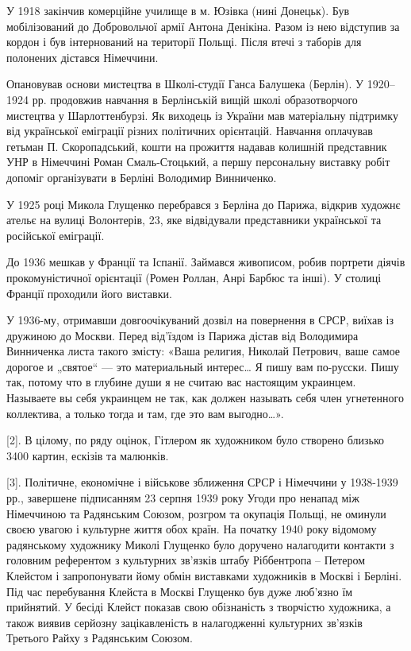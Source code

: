 У 1918 закінчив комерційне училище в м. Юзівка (нині Донецьк). Був
мобілізований до Добровольчої армії Антона Денікіна. Разом із нею відступив за
кордон і був інтернований на території Польщі. Після втечі з таборів для
полонених дістався Німеччини.

Опановував основи мистецтва в Школі-студії Ганса Балушека (Берлін). У 1920–1924
рр. продовжив навчання в Берлінській вищій школі образотворчого мистецтва у
Шарлоттенбурзі. Як виходець із України мав матеріальну підтримку від
української еміграції різних політичних орієнтацій. Навчання оплачував гетьман
П. Скоропадський, кошти на прожиття надавав колишній представник УНР в
Німеччині Роман Смаль-Стоцький, а першу персональну виставку робіт допоміг
організувати в Берліні Володимир Винниченко.

У 1925 році Микола Глущенко перебрався з Берліна до Парижа, відкрив художнє
ательє на вулиці Волонтерів, 23, яке відвідували представники української та
російської еміграції.

До 1936 мешкав у Франції та Іспанії. Займався живописом, робив портрети діячів
прокомуністичної орієнтації (Ромен Роллан, Анрі Барбюс та інші). У столиці
Франції проходили його виставки. 

У 1936-му, отримавши довгоочікуваний дозвіл на повернення в СРСР, виїхав із
дружиною до Москви. Перед від'їздом із Парижа дістав від Володимира Винниченка
листа такого змісту: «Ваша религия, Николай Петрович, ваше самое дорогое и
„святое“ — это материальный интерес… Я пишу вам по-русски. Пишу так, потому что
в глубине души я не считаю вас настоящим украинцем. Называете вы себя украинцем
не так, как должен называть себя член угнетенного коллектива, а только тогда и
там, где это вам выгодно…».  

[2]. В цілому, по ряду оцінок, Гітлером як художником було створено близько
3400 картин, ескізів та малюнків.

[3]. Політичне, економічне і військове зближення СРСР і Німеччини у 1938-1939
рр., завершене підписанням 23 серпня 1939 року Угоди про ненапад між Німеччиною
та Радянським Союзом, розгром та окупація Польщі, не оминули своєю увагою і
культурне життя обох країн. На початку 1940 року відомому радянському художнику
Миколі Глущенко було доручено налагодити контакти з головним референтом з
культурних зв'язків штабу Ріббентропа – Петером Клейстом і запропонувати йому
обмін виставками художників в Москві і Берліні. Під час перебування Клейста в
Москві Глущенко був дуже люб'язно їм прийнятий. У бесіді Клейст показав свою
обізнаність з творчістю художника, а також виявив серйозну зацікавленість в
налагодженні культурних зв'язків Третього Райху з Радянським Союзом. 

